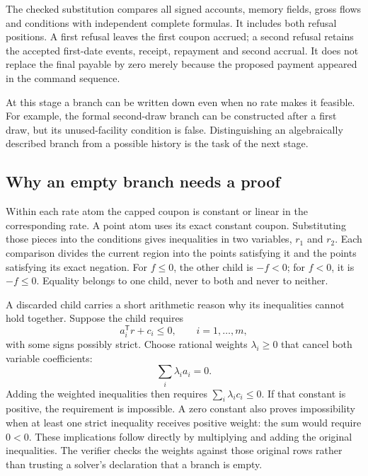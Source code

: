 The checked substitution compares all signed accounts, memory fields, gross flows and conditions with independent complete formulas. It includes both refusal positions. A first refusal leaves the first coupon accrued; a second refusal retains the accepted first-date events, receipt, repayment and second accrual. It does not replace the final payable by zero merely because the proposed payment appeared in the command sequence.

At this stage a branch can be written down even when no rate makes it feasible. For example, the formal second-draw branch can be constructed after a first draw, but its unused-facility condition is false. Distinguishing an algebraically described branch from a possible history is the task of the next stage.

\subsection{Why an empty branch needs a proof}

Within each rate atom the capped coupon is constant or linear in the corresponding rate. A point atom uses its exact constant coupon. Substituting those pieces into the conditions gives inequalities in two variables, $r_1$ and $r_2$. Each comparison divides the current region into the points satisfying it and the points satisfying its exact negation. For $f\leq0$, the other child is $-f<0$; for $f<0$, it is $-f\leq0$. Equality belongs to one child, never to both and never to neither.

A discarded child carries a short arithmetic reason why its inequalities cannot hold together. Suppose the child requires
\begin{equation}
 a_i^{\mathsf T}r+c_i\leq0,\qquad i=1,\ldots,m,
 \label{eq:certified-region-constraints}
\end{equation}
with some signs possibly strict. Choose rational weights $\lambda_i\geq0$ that cancel both variable coefficients:
\begin{equation}
 \sum_i\lambda_i a_i=0.
\end{equation}
Adding the weighted inequalities then requires $\sum_i\lambda_i c_i\leq0$. If that constant is positive, the requirement is impossible. A zero constant also proves impossibility when at least one strict inequality receives positive weight: the sum would require $0<0$. These implications follow directly by multiplying and adding the original inequalities. The verifier checks the weights against those original rows rather than trusting a solver's declaration that a branch is empty.

